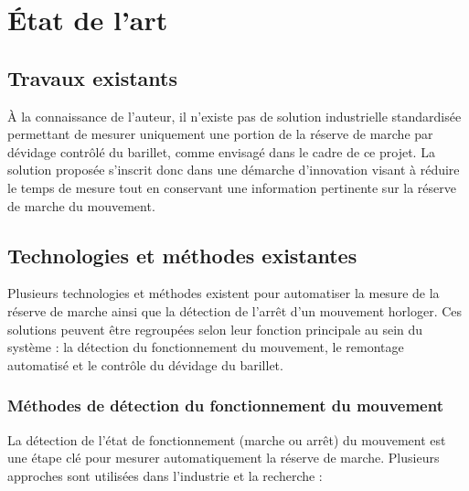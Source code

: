 \chapter{État de l'art}

\section{Travaux existants}

À la connaissance de l’auteur, il n’existe pas de solution industrielle standardisée permettant de mesurer uniquement une portion de la réserve de marche par dévidage contrôlé du barillet, comme envisagé dans le cadre de ce projet. La solution proposée s’inscrit donc dans une démarche d’innovation visant à réduire le temps de mesure tout en conservant une information pertinente sur la réserve de marche du mouvement.

\section{Technologies et méthodes existantes}

Plusieurs technologies et méthodes existent pour automatiser la mesure de la réserve de marche ainsi que la détection de l’arrêt d’un mouvement horloger. Ces solutions peuvent être regroupées selon leur fonction principale au sein du système : la détection du fonctionnement du mouvement, le remontage automatisé et le contrôle du dévidage du barillet.

\subsection{Méthodes de détection du fonctionnement du mouvement}

La détection de l’état de fonctionnement (marche ou arrêt) du mouvement est une étape clé pour mesurer automatiquement la réserve de marche. Plusieurs approches sont utilisées dans l’industrie et la recherche :

